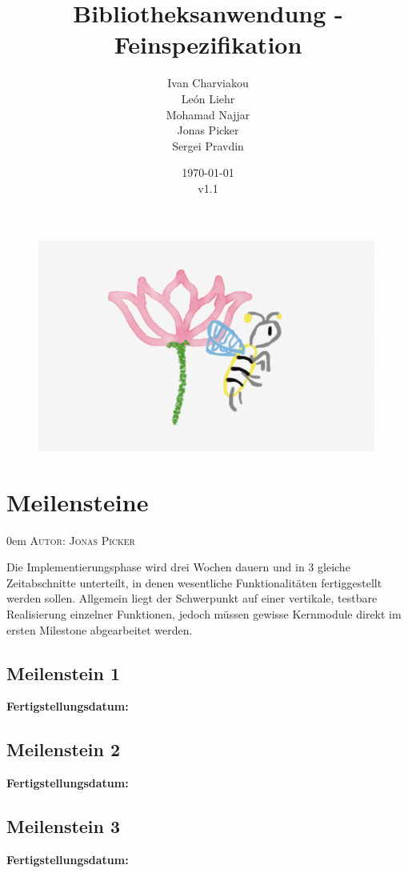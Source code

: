 \documentclass{article}
\title{Bibliotheksanwendung - Feinspezifikation}
\date{\today\\v1.1}
\author{
	Ivan Charviakou\\
	León Liehr\\
	Mohamad Najjar\\
	Jonas Picker\\
	Sergei Pravdin
}
\makeatletter
\newcommand{\sectionauthor}[1]{
	{\parindent 0em \large \scshape Autor: #1 \par \nobreak \vspace*{1em}}
	\@afterheading
}
\makeatother
\begin{document}
\maketitle
\begin{figure}[H]
	\centering
	\includegraphics[width = 30em]{Logo}
\end{figure}
\newpage
\tableofcontents
\newpage


\section{Meilensteine}
\sectionauthor{Jonas Picker}
Die Implementierungsphase wird drei Wochen dauern und in 3 gleiche Zeitabschnitte unterteilt, in denen wesentliche Funktionalitäten fertiggestellt werden sollen. Allgemein liegt der Schwerpunkt auf einer vertikale, testbare Realisierung einzelner Funktionen, jedoch müssen gewisse Kernmodule direkt im ersten Milestone abgearbeitet werden. 
\subsection{Meilenstein 1}
\textbf{Fertigstellungsdatum:} 
\subsection{Meilenstein 2}
\textbf{Fertigstellungsdatum:} 
\subsection{Meilenstein 3}
\textbf{Fertigstellungsdatum:} 
\end{document}
